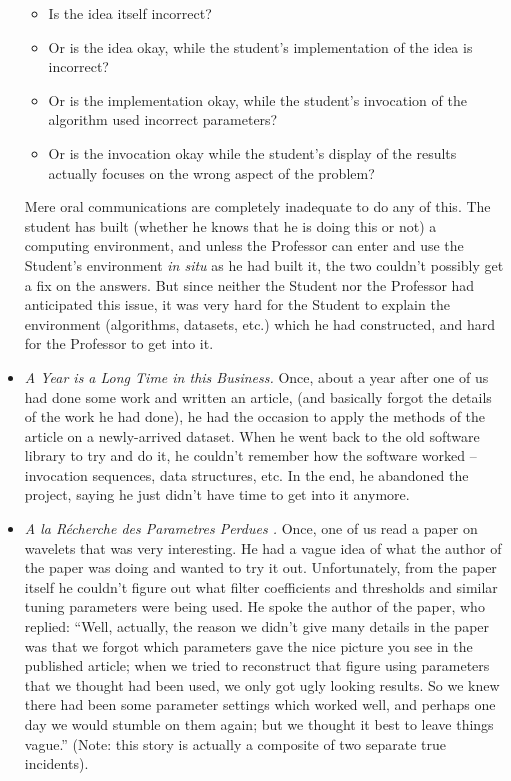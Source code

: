 \begin{itemize}
\begin{itemize}

\item Is the idea itself incorrect?
\item Or is the idea okay, while the student's implementation of the idea is incorrect?

\item Or is the implementation okay,
while the student's invocation of the algorithm used incorrect
parameters?
\item Or is the invocation okay while the student's display of the results actually focuses
on the wrong aspect of the problem?

\end{itemize}

Mere oral communications
are completely inadequate to do any of this.
The student has built (whether he knows that he
is doing this or not) a computing environment,
and unless the Professor can enter and use the Student's environment
{\it in situ}
as he had built it, the two couldn't possibly
get a fix on the answers.  But since neither the Student nor the Professor 
had anticipated
this issue, it was very hard for the Student to explain the environment
(algorithms, datasets, etc.) which he had constructed,
and hard for the Professor to get into it.

\item {\it A Year is a Long Time in this Business.}
Once, about a year after one of us had done some work and written
an article, (and basically forgot the details of the work he had done), 
he had the occasion
to apply the methods of the article on a newly-arrived dataset.
When he went back to the old software library
to try and do it, he couldn't remember how the software
worked -- invocation sequences, data structures, etc.   In the end,
he abandoned the project, saying he just didn't have time to get into it anymore.

\item {\it A la R\'echerche des Parametres Perdues .}
Once, one of us read a paper on wavelets that was very interesting.
He had a vague idea of what the author of the paper was doing and wanted to
try it out.  Unfortunately, from the paper itself
he couldn't figure out what filter coefficients
and thresholds and similar tuning parameters were being used.
He spoke the author of the paper, who replied: ``Well, actually,
the reason we didn't give many details
in the paper was that we forgot which parameters gave the nice
picture you see in the published article; 
when we tried to reconstruct that figure
using parameters that we thought had been used, we only got
ugly looking results. So we knew there had been some
parameter settings which worked well, and perhaps one day
we would stumble on them again; but we thought it best to
leave things vague.'' (Note: this story is actually a composite
of two separate true incidents).
\end{itemize}

